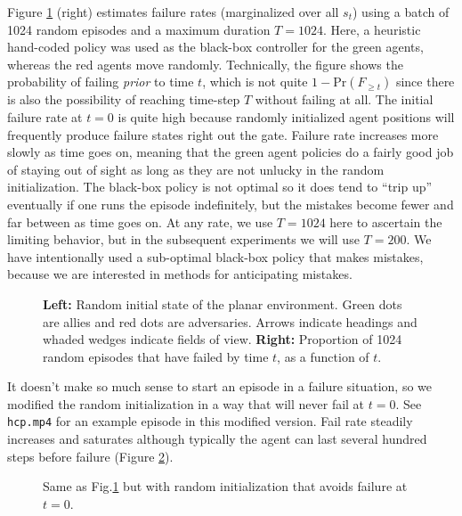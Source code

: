 \documentclass[12pt,letterpaper]{article}
\begin{document}
Figure \ref{fig:planar} (right) estimates failure rates (marginalized over all $s_t$) using a batch of 1024 random episodes and a maximum duration $T=1024$.  Here, a heuristic hand-coded policy was used as the black-box controller for the green agents, whereas the red agents move randomly. Technically, the figure shows the probability of failing \textit{prior} to time $t$, which is not quite $1 - \text{Pr}(F_{\geq t})$ since there is also the possibility of reaching time-step $T$ without failing at all.  The initial failure rate at $t=0$ is quite high because randomly initialized agent positions will frequently produce failure states right out the gate.  Failure rate increases more slowly as time goes on, meaning that the green agent policies do a fairly good job of staying out of sight as long as they are not unlucky in the random initialization.  The black-box policy is not optimal so it does tend to ``trip up'' eventually if one runs the episode indefinitely, but the mistakes become fewer and far between as time goes on.  At any rate, we use $T=1024$ here to ascertain the limiting behavior, but in the subsequent experiments we will use $T=200$.  We have intentionally used a sub-optimal black-box policy that makes mistakes, because we are interested in methods for anticipating mistakes.

\begin{figure}[htbp]
    \centering
    \caption{\textbf{Left:} Random initial state of the planar environment.  Green dots are allies and red dots are adversaries.  Arrows indicate headings and whaded wedges indicate fields of view. \textbf{Right:} Proportion of 1024 random episodes that have failed by time $t$, as a function of $t$.}
    \label{fig:planar}
\end{figure}

It doesn't make so much sense to start an episode in a failure situation, so we modified the random initialization in a way that will never fail at $t=0$.  See \texttt{hcp.mp4} for an example episode in this modified version.  Fail rate steadily increases and saturates although typically the agent can last several hundred steps before failure (Figure \ref{fig:planar_upper}).

\begin{figure}[htbp]
    \centering
    \caption{Same as Fig.\@ \ref{fig:planar} but with random initialization that avoids failure at $t=0$.}
    \label{fig:planar_upper}
\end{figure}
\end{document}
